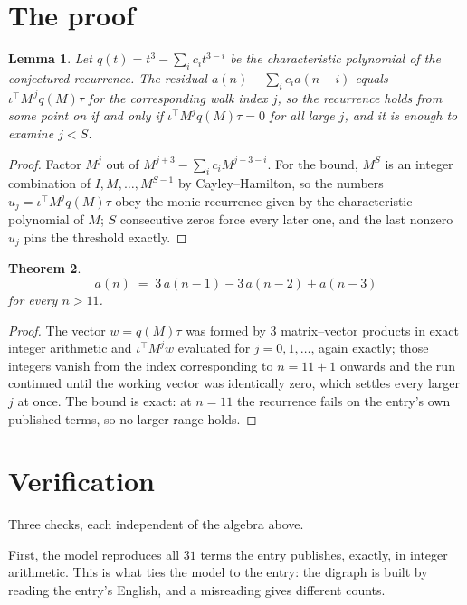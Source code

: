 \documentclass[11pt,a4paper]{article}
\theoremstyle{plain}
\newtheorem{theorem}{Theorem}
\newtheorem{lemma}[theorem]{Lemma}
\theoremstyle{definition}
\begin{document}
\section{The proof}

\begin{lemma}\label{lem:crit}
Let $q(t)=t^{3}-\sum_i c_it^{3-i}$ be the characteristic polynomial of the
conjectured recurrence. The residual $a(n)-\sum_ic_ia(n-i)$ equals
$\iota^{\!\top}M^{\,j}q(M)\tau$ for the corresponding walk index $j$, so the recurrence
holds from some point on if and only if $\iota^{\!\top}M^{j}q(M)\tau=0$ for all large $j$,
and it is enough to examine $j<S$.
\end{lemma}

\begin{proof}
Factor $M^{j}$ out of $M^{j+3}-\sum_ic_iM^{j+3-i}$. For the bound, $M^{S}$
is an integer combination of $I,M,\dots,M^{S-1}$ by Cayley--Hamilton, so the numbers
$u_j=\iota^{\!\top}M^{j}q(M)\tau$ obey the monic recurrence given by the characteristic
polynomial of $M$; $S$ consecutive zeros force every later one, and the last nonzero $u_j$
pins the threshold exactly.
\end{proof}

\begin{theorem}
\[
a(n)\;=\;3\,a(n-1) - 3\,a(n-2) + a(n-3)
\]
for every $n>11$.
\end{theorem}

\begin{proof}
The vector $w=q(M)\tau$ was formed by $3$ matrix--vector products in exact integer
arithmetic and $\iota^{\!\top}M^{j}w$ evaluated for $j=0,1,\dots$, again exactly; those
integers vanish from the index corresponding to $n=11+1$ onwards and the run continued
until the working vector was identically zero, which settles every larger $j$ at once. The bound is exact: at $n=11$ the recurrence fails on the entry's own published terms, so no larger range holds.
\end{proof}

\section{Verification}

Three checks, each independent of the algebra above.

First, the model reproduces all $31$ terms the entry publishes, exactly, in integer
arithmetic. This is what ties the model to the entry: the digraph is built by reading the
entry's English, and a misreading gives different counts.
\end{document}
